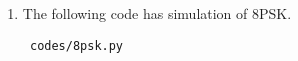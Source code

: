 \begin{enumerate}[label=\thesubsection.\arabic*.,ref=\thesubsection.\theenumi]
\item The following code has simulation of 8PSK.
\begin{lstlisting}
 codes/8psk.py
\end{lstlisting}




















\end{enumerate}
